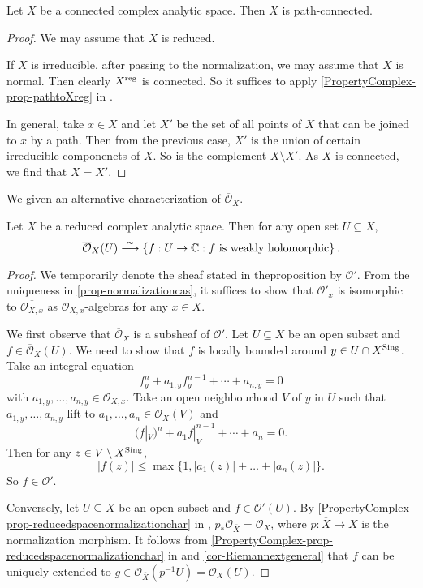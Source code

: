 \begin{corollary}
    Let $X$ be a connected complex analytic space. Then $X$ is path-connected.
\end{corollary}
\begin{proof}
    We may assume that $X$ is reduced.

    If $X$ is irreducible, after passing to the normalization, we may assume that $X$ is normal. Then clearly $X^{\operatorname{reg}}$ is connected. So it suffices to apply \cref{PropertyComplex-prop-pathtoXreg} in .

    In general, take $x\in X$ and let $X'$ be the set of all points of $X$ that can be joined to $x$ by a path. Then from the previous case, $X'$ is the union of certain irreducible componenets of $X$. So is the complement $X\setminus X'$. As $X$ is connected, we find that $X=X'$.
\end{proof}


We given an alternative characterization of $\overline{\mathcal{O}}_X$.
\begin{proposition}
    Let $X$ be a reduced complex analytic space. Then for any open set $U\subseteq X$, 
    \[
        \overline{\mathcal{O}}_X(U)\stackrel{\sim}{\longrightarrow} \left\{f:U\rightarrow \mathbb{C}: f\text{ is weakly holomorphic} \right\}.      
    \]
\end{proposition}

\begin{proof}
    We temporarily denote the sheaf stated in theproposition by $\mathcal{O}'$. From the uniqueness in \cref{prop-normalizationcas}, it suffices to show that $\mathcal{O}'_{x}$ is isomorphic to $\overline{\mathcal{O}_{X,x}}$ as $\mathcal{O}_{X,x}$-algebras for any $x\in X$.

    We first observe that $\overline{\mathcal{O}}_X$ is a subsheaf of  $\mathcal{O}'$. Let $U\subseteq X$ be an open subset and $f\in \overline{\mathcal{O}}_X(U)$.  We need to show that $f$ is locally bounded around $y\in U\cap X^{\operatorname{Sing}}$. 
    Take an integral equation
    \[
        f_y^n+a_{1,y}f_y^{n-1}+\cdots+a_{n,y}=0  
    \]
    with $a_{1,y},\ldots,a_{n,y}\in \mathcal{O}_{X,x}$.
    Take an open neighbourhood $V$ of $y$ in $U$ such that $a_{1,y},\ldots,a_{n,y}$ lift to $a_1,\ldots,a_n\in \mathcal{O}_X(V)$ and
    \[
        (f|_V)^n +a_1f|_V^{n-1}+\cdots+ a_n=0. 
    \] 
    Then for any $z\in V\setminus X^{\operatorname{Sing}}$,
    \[
        |f(z)|\leq \max\{1,|a_1(z)|+\ldots+|a_n(z)|\}.  
    \]
    So $f\in \mathcal{O}'$. 
    
    Conversely, let $U\subseteq X$ be an open subset and $f\in \mathcal{O}'(U)$. By \cref{PropertyComplex-prop-reducedspacenormalizationchar} in , $p_*\mathcal{O}_{\overline{X}}=\mathcal{O}_X$, where $p:\overline{X}\rightarrow X$ is the normalization morphism. It follows from \cref{PropertyComplex-prop-reducedspacenormalizationchar} in  and \cref{cor-Riemannextgeneral} that $f$ can be uniquely extended to $g\in \mathcal{O}_{\overline{X}}(p^{-1}U)=\mathcal{O}_X(U)$.
\end{proof}


